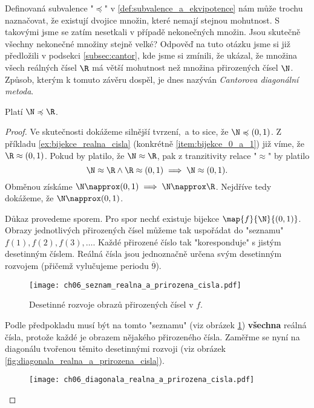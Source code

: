 Definovaná subvalence "$\preccurlyeq$" v \ref{def:subvalence_a_ekvipotence} nám může trochu naznačovat, že existují dvojice množin, které nemají stejnou mohutnost. S takovými jsme se zatím nesetkali v případě nekonečných množin. Jsou skutečně všechny nekonečné množiny stejně velké? Odpověď na tuto otázku jsme si již předložili v podsekci \ref{subsec:cantor}, kde jsme si zmínili, že  ukázal, že množina všech reálných čísel $\R$ má větší mohutnost než množina přirozených čísel $\N$. Způsob, kterým k tomuto závěru dospěl, je dnes nazýván \emph{Cantorova diagonální metoda}.
\begin{theorem}\label{thm:N_a_R}
    Platí $\N\preccurlyeq\R$.
\end{theorem}
\begin{proof}
    Ve skutečnosti dokážeme silnější tvrzení,~a to sice, že $\N\preccurlyeq(0,1)$. Z příkladu \ref{ex:bijekce_realna_cisla} (konkrétně \ref{item:bijekce_0_a_1}) již víme, že $\R\approx(0,1)$. Pokud by platilo, že $\N\approx\R$, pak z tranzitivity relace "$\approx$" by platilo
    \begin{equation*}
        \N\approx\R \land \R\approx(0,1) \implies \N\approx(0,1).
    \end{equation*}
    Obměnou získáme $\N\napprox(0,1)\implies\N\napprox\R$. Nejdříve tedy dokážeme, že $\N\napprox(0,1)$.\par
    Důkaz provedeme sporem. Pro spor nechť existuje bijekce $\map{f}{\N}{(0,1)}$. Obrazy jednotlivých přirozených čísel můžeme tak uspořádat do "seznamu" $f(1),f(2),f(3),\dots$. Každé přirozené číslo tak "koresponduje" s jistým desetinným číslem. Reálná čísla jsou jednoznačně určena svým desetinným rozvojem (přičemž vylučujeme periodu $\overline{9}$).
    \begin{figure}[H]
        \centering
        \texttt{[image: ch06\_seznam\_realna\_a\_prirozena\_cisla.pdf]}
        \caption{Desetinné rozvoje obrazů přirozených čísel v $f$.}
        \label{fig:seznam_realna_a_prirozena_cisla}
    \end{figure}
    Podle předpokladu musí být na tomto "seznamu" (viz obrázek \ref{fig:seznam_realna_a_prirozena_cisla}) \textbf{všechna} reálná čísla, protože každé je obrazem nějakého přirozeného čísla. Zaměřme se nyní na diagonálu tvořenou těmito desetinnými rozvoji (viz obrázek \ref{fig:diagonala_realna_a_prirozena_cisla}).
    \begin{figure}[H]
        \centering
        \texttt{[image: ch06\_diagonala\_realna\_a\_prirozena\_cisla.pdf]}

\end{figure}
\end{proof}
